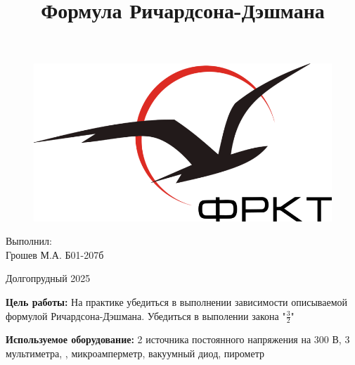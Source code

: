 \documentclass[a4paper, 12pt]{article}
\title{Формула Ричардсона-Дэшмана}
\date{}
\begin{document}

    \begin{titlepage}
    \maketitle
    \thispagestyle{empty}

            \begin{figure}[h]
            \centering
            \includegraphics[scale=1.3]{./pics/rt.png}
            \end{figure}

             \vspace{15em}
             \begin{flushright}
                 \normalsize Выполнил:\\
                             Грошев М.А. Б01-207б
             \end{flushright}

             \begin{center}
                    \vfill \normalsize Долгопрудный 2025
             \end{center}
    \end{titlepage}


\newpage
\setcounter{page}{1}

\textbf{Цель работы:}  На практике убедиться в выполнении зависимости описываемой формулой
Ричардсона-Дэшмана. Убедиться в выполении закона "$\frac{3}{2}$"\\

\par
\textbf{Используемое оборудование:} 2 источника постоянного напряжения на 300 В, 3 мультиметра,
, микроамперметр, вакуумный диод, пирометр \\
\end{document}
